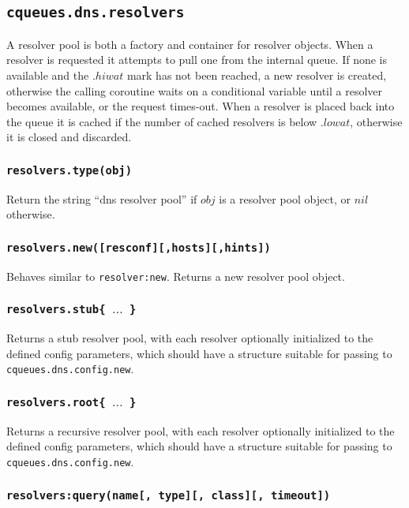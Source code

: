 \documentclass[11pt, oneside]{memoir}
\newcommand*{\routine}[1]{\texttt{#1}\xspace}
\newcommand*{\fn}[1]{\texttt{#1}\xspace}
\newcounter{toccols}
\newenvironment{Module}[1]{
	\subsection{\texttt{#1}}
	\addtocontents{toc}{
		\protect\begin{multicols}{\value{toccols}}
	}
}{
	\addtocontents{toc}{\protect\end{multicols}}
}
\begin{document}
\begin{Module}{cqueues.dns.resolvers}

A resolver pool is both a factory and container for resolver objects. When a resolver is requested it attempts to pull one from the internal queue. If none is available and the $.hiwat$ mark has not been reached, a new resolver is created, otherwise the calling coroutine waits on a conditional variable until a resolver becomes available, or the request times-out. When a resolver is placed back into the queue it is cached if the number of cached resolvers is below $.lowat$, otherwise it is closed and discarded.

\subsubsection[\routine{resolvers.type}]{\routine{resolvers.type(obj)}}
Return the string ``dns resolver pool'' if $obj$ is a resolver pool object, or $nil$ otherwise.

\subsubsection[\fn{resolvers.new}]{\fn{resolvers.new([resconf][,hosts][,hints])}}

Behaves similar to \fn{resolver:new}. Returns a new resolver pool object.

\subsubsection[\fn{resolvers.stub}]{\fn{resolvers.stub\{ $\ldots$ \}}}

Returns a stub resolver pool, with each resolver optionally initialized to the defined config parameters, which should have a structure suitable for passing to \fn{cqueues.dns.config.new}.

\subsubsection[\fn{resolvers.root}]{\fn{resolvers.root\{ $\ldots$ \}}}

Returns a recursive resolver pool, with each resolver optionally initialized to the defined config parameters, which should have a structure suitable for passing to \fn{cqueues.dns.config.new}.

\subsubsection[\fn{resolvers:query}]{\fn{resolvers:query(name[, type][, class][, timeout])}}


\end{Module}
\end{document}
